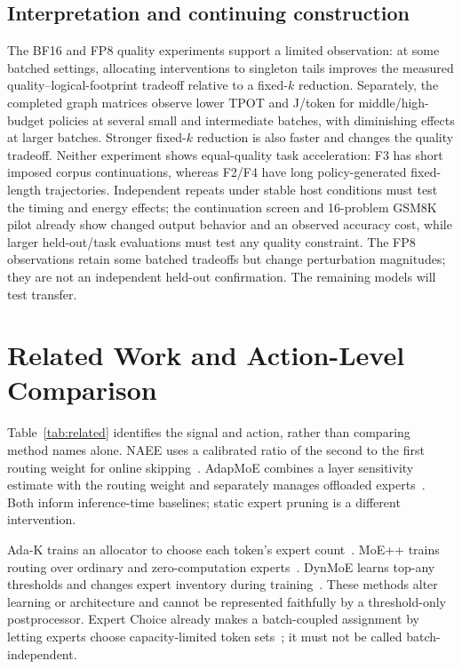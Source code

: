 \documentclass[10pt,twocolumn]{article}
\begin{document}
\subsection{Interpretation and continuing construction}
The BF16 and FP8 quality experiments support a limited observation: at some batched settings, allocating interventions to singleton tails improves the measured quality--logical-footprint tradeoff relative to a fixed-$k$ reduction. Separately, the completed graph matrices observe lower TPOT and J/token for middle/high-budget policies at several small and intermediate batches, with diminishing effects at larger batches. Stronger fixed-$k$ reduction is also faster and changes the quality tradeoff. Neither experiment shows equal-quality task acceleration: F3 has short imposed corpus continuations, whereas F2/F4 have long policy-generated fixed-length trajectories. Independent repeats under stable host conditions must test the timing and energy effects; the continuation screen and 16-problem GSM8K pilot already show changed output behavior and an observed accuracy cost, while larger held-out/task evaluations must test any quality constraint. The FP8 observations retain some batched tradeoffs but change perturbation magnitudes; they are not an independent held-out confirmation. The remaining models will test transfer.

\section{Related Work and Action-Level Comparison}
Table~\ref{tab:related} identifies the signal and action, rather than comparing method names alone. NAEE uses a calibrated ratio of the second to the first routing weight for online skipping~\cite{naee}. AdapMoE combines a layer sensitivity estimate with the routing weight and separately manages offloaded experts~\cite{adapmoe}. Both inform inference-time baselines; static expert pruning is a different intervention.

Ada-K trains an allocator to choose each token's expert count~\cite{adak}. MoE++ trains routing over ordinary and zero-computation experts~\cite{moepp}. DynMoE learns top-any thresholds and changes expert inventory during training~\cite{dynmoe}. These methods alter learning or architecture and cannot be represented faithfully by a threshold-only postprocessor. Expert Choice already makes a batch-coupled assignment by letting experts choose capacity-limited token sets~\cite{expertchoice}; it must not be called batch-independent.
\end{document}
